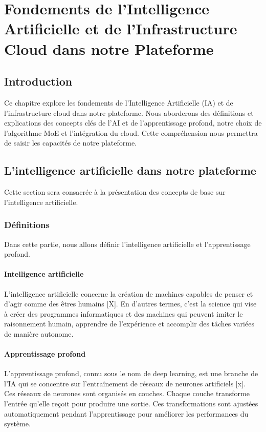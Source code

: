 \vfill 
\chapter{Fondements de l'Intelligence Artificielle et de l'Infrastructure Cloud dans notre Plateforme}
\label{chap:fondements de l'Intelligence Artificielle et de l'Infrastructure Cloud dans notre Plateforme}
\vfill 
\minitoc
\mtcaddchapter
\vfill 

\newpage

\section*{Introduction}
\justifying
Ce chapitre explore les fondements de l'Intelligence Artificielle (IA) et de l'infrastructure cloud dans notre plateforme. Nous aborderons des définitions et explications des concepts clés de l’AI et de l’apprentissage profond, notre choix de l'algorithme MoE et l'intégration du cloud. Cette compréhension nous permettra de saisir les capacités de notre plateforme.

\section{L'intelligence artificielle dans notre plateforme}
\justifying
Cette section sera consacrée à la présentation des concepts de base sur 
l’intelligence artificielle.
\subsection{Définitions}
\justifying
Dans cette partie, nous allons définir l'intelligence artificielle et l'apprentissage profond.


\subsubsection{Intelligence artificielle}
\justifying
L'intelligence artificielle concerne la création de machines capables de penser et d'agir comme des êtres humains [X]. En d'autres termes, c'est la science qui vise à créer des programmes informatiques et des machines qui peuvent imiter le raisonnement humain, apprendre de l'expérience et accomplir des tâches variées de manière autonome.

\subsubsection{Apprentissage profond}
\justifying
L'apprentissage profond, connu sous le nom de deep learning, est une branche de l’IA qui se concentre sur l'entraînement de réseaux de neurones artificiels [x].\\
Ces réseaux de neurones sont organisés en couches. Chaque couche transforme l'entrée qu'elle reçoit pour produire une sortie. Ces transformations sont ajustées automatiquement pendant l'apprentissage pour améliorer les performances du système.

